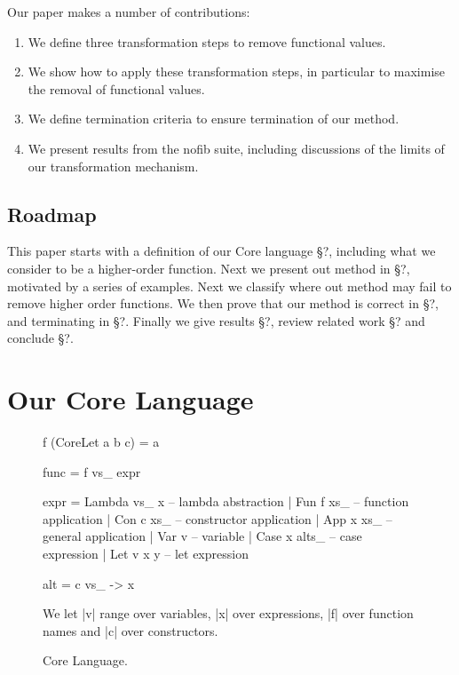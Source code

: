 \documentclass[preprint]{sigplanconf}
\begin{document}
Our paper makes a number of contributions:

\begin{enumerate}
\item We define three transformation steps to remove functional values.
\item We show how to apply these transformation steps, in particular to maximise the removal of functional values.
\item We define termination criteria to ensure termination of our method.
\item We present results from the nofib suite, including discussions of the limits of our transformation mechanism.
\end{enumerate}

\subsection{Roadmap}

This paper starts with a definition of our Core language \S?, including what we consider to be a higher-order function. Next we present out method in \S?, motivated by a series of examples. Next we classify where out method may fail to remove higher order functions. We then prove that our method is correct in \S?, and terminating in \S?. Finally we give results \S?, review related work \S? and conclude \S?.

\section{Our Core Language}

\begin{figure}
\begin{code}
f (CoreLet a b c) = a


func = f vs_ expr

expr  =  Lambda vs_ x    -- lambda abstraction
      |  Fun f xs_       -- function application
      |  Con c xs_       -- constructor application
      |  App x xs_       -- general application
      |  Var v           -- variable
      |  Case x alts_    -- case expression
      |  Let v x y       -- let expression

alt = c vs_ -> x
\end{code}

We let |v| range over variables, |x| over expressions, |f| over function names and |c| over constructors.
\caption{Core Language.}
\label{fig:core}
\end{figure}
\end{document}
